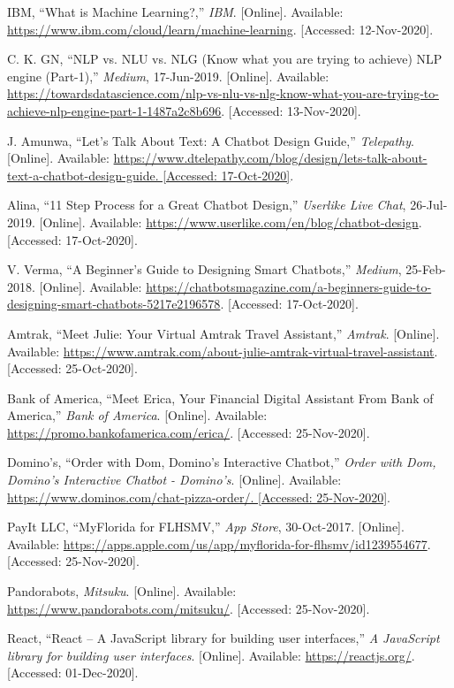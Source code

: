 \documentclass[titlepage, 12pt]{article}
\begin{document}
\begin{thebibliography}{9}
IBM, “What is Machine Learning?,” \emph{IBM}. [Online]. Available: \url{https://www.ibm.com/cloud/learn/machine-learning}. [Accessed: 12-Nov-2020].

C. K. GN, “NLP vs. NLU vs. NLG (Know what you are trying to achieve) NLP engine (Part-1),” \emph{Medium}, 17-Jun-2019. [Online]. Available: \url{https://towardsdatascience.com/nlp-vs-nlu-vs-nlg-know-what-you-are-trying-to-achieve-nlp-engine-part-1-1487a2c8b696}. [Accessed: 13-Nov-2020].

J. Amunwa, “Let's Talk About Text: A Chatbot Design Guide,” \emph{Telepathy}. [Online]. Available: \url{https://www.dtelepathy.com/blog/design/lets-talk-about-text-a-chatbot-design-guide. [Accessed: 17-Oct-2020]}.

Alina, “11 Step Process for a Great Chatbot Design,” \emph{Userlike Live Chat}, 26-Jul-2019. [Online]. Available: \url{https://www.userlike.com/en/blog/chatbot-design}. [Accessed: 17-Oct-2020].

V. Verma, “A Beginner's Guide to Designing Smart Chatbots,” \emph{Medium}, 25-Feb-2018. [Online]. Available: \url{https://chatbotsmagazine.com/a-beginners-guide-to-designing-smart-chatbots-5217e2196578}. [Accessed: 17-Oct-2020].

Amtrak, “Meet Julie: Your Virtual Amtrak Travel Assistant,” \emph{Amtrak}. [Online]. Available: \url{https://www.amtrak.com/about-julie-amtrak-virtual-travel-assistant}. [Accessed: 25-Oct-2020].

Bank of America, “Meet Erica, Your Financial Digital Assistant From Bank of America,” \emph{Bank of America}. [Online]. Available: \url{https://promo.bankofamerica.com/erica/}. [Accessed: 25-Nov-2020].

Domino's, “Order with Dom, Domino's Interactive Chatbot,” \emph{Order with Dom, Domino's Interactive Chatbot - Domino's}. [Online]. Available: \url{https://www.dominos.com/chat-pizza-order/. [Accessed: 25-Nov-2020]}.

PayIt LLC, “‎MyFlorida for FLHSMV,” \emph{App Store}, 30-Oct-2017. [Online]. Available: \url{https://apps.apple.com/us/app/myflorida-for-flhsmv/id1239554677}. [Accessed: 25-Nov-2020].

Pandorabots, \emph{Mitsuku}. [Online]. Available: \url{https://www.pandorabots.com/mitsuku/}. [Accessed: 25-Nov-2020].

React, “React – A JavaScript library for building user interfaces,” \emph{A JavaScript library for building user interfaces}. [Online]. Available: \url{https://reactjs.org/}. [Accessed: 01-Dec-2020].


\end{thebibliography}
\end{document}

